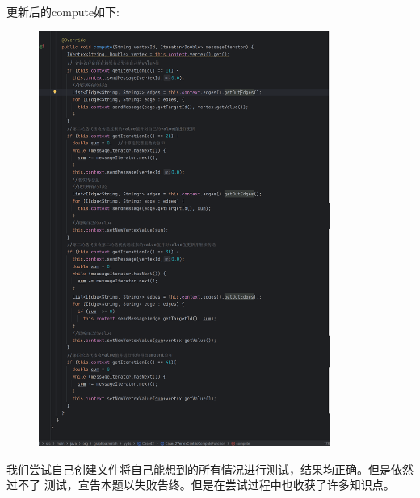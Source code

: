更新后的compute如下:
\begin{figure}[H]
  \begin{center}
    \includegraphics[width=0.85\textwidth,scale=0.7]{./figures/pro3/8.png}
  \end{center}
\end{figure}

我们尝试自己创建文件将自己能想到的所有情况进行测试，结果均正确。但是依然过不了
测试，宣告本题以失败告终。但是在尝试过程中也收获了许多知识点。
